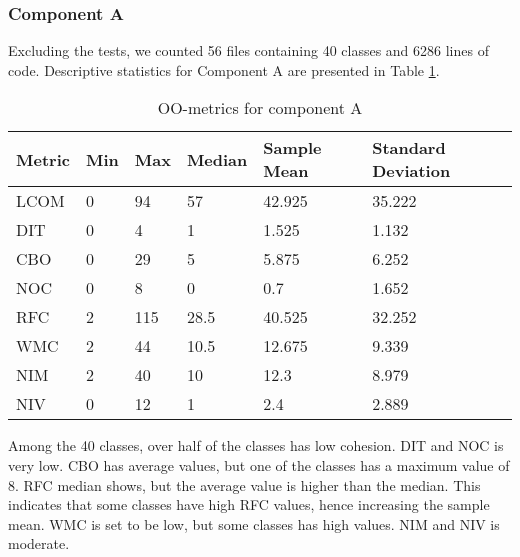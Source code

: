 \subsubsection{Component A}
Excluding the tests, we counted 56 files containing 40 classes and 6286 lines of code. Descriptive statistics for Component A are presented in Table \ref{tab:oometrics-al}.
\begin{table}[]
\centering
\caption{OO-metrics for component A}
\label{tab:oometrics-al}
\begin{tabular}{|l|l|l|l|l|l|}
\hline
\textbf{Metric} & \textbf{Min} & \textbf{Max} & \textbf{Median} & \textbf{Sample Mean} & \textbf{Standard Deviation} \\ \hline
LCOM            & 0            & 94           & 57              & 42.925               & 35.222                      \\ \hline
DIT             & 0            & 4            & 1               & 1.525                & 1.132                       \\ \hline
CBO             & 0            & 29           & 5               & 5.875                & 6.252                       \\ \hline
NOC             & 0            & 8            & 0               & 0.7                  & 1.652                       \\ \hline
RFC             & 2            & 115          & 28.5            & 40.525               & 32.252                      \\ \hline
WMC             & 2            & 44           & 10.5            & 12.675               & 9.339                       \\ \hline
NIM             & 2            & 40           & 10              & 12.3                 & 8.979                       \\ \hline
NIV             & 0            & 12           & 1               & 2.4                  & 2.889                       \\ \hline
\end{tabular}
\end{table}

Among the 40 classes, over half of the classes has low cohesion. 
DIT and NOC is very low.
CBO has average values, but one of the classes has a maximum value of 8.
RFC median shows, but the average value is higher than the median. This indicates that some classes have high RFC values, hence increasing the sample mean. WMC is set to be low, but some classes has high values.
NIM and NIV is moderate.












